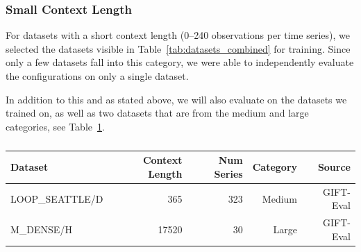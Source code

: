 \subsubsection{Small Context Length}
For datasets with a short context length (0–240 observations per time series), we selected the datasets visible in Table~\ref{tab:datasets_combined} for training.
Since only a few datasets fall into this category, we were able to independently evaluate the configurations on only a single dataset.
\begin{table}[H]
\centering
{}
\caption{}
\label{tab:datasets_combined}
\end{table}
In addition to this and as stated above, we will also evaluate on the datasets we trained on, as well as two datasets that are from the medium and large categories, see Table~\ref{tab:selected_datasets}.
\begin{table}[H]
\centering
\begin{tabular}{lrrrr}
\hline
Dataset & Context Length & Num Series & Category & Source \\
\hline
LOOP\_SEATTLE/D & 365 & 323 & Medium & GIFT-Eval \\
M\_DENSE/H & 17520 & 30 & Large & GIFT-Eval \\
\hline
\end{tabular}
\caption{}
\label{tab:selected_datasets}
\end{table}
